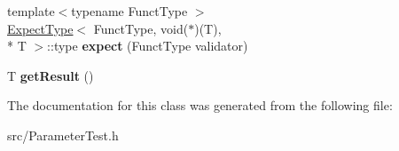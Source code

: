 \begin{DoxyCompactItemize}
\item 
\hypertarget{class_result_wrapper_a8a67c85158b1409e5d505f35e9b0288a}{{\footnotesize template$<$typename Funct\-Type $>$ }\\\hyperlink{struct_expect_type}{Expect\-Type}$<$ Funct\-Type, void($\ast$)(T), \\*
T $>$\-::type {\bfseries expect} (Funct\-Type validator)}\label{class_result_wrapper_a8a67c85158b1409e5d505f35e9b0288a}

\item 
\hypertarget{class_result_wrapper_a3325557a90094ce9fcffa2fb0712a0c5}{T {\bfseries get\-Result} ()}\label{class_result_wrapper_a3325557a90094ce9fcffa2fb0712a0c5}

\end{DoxyCompactItemize}


The documentation for this class was generated from the following file\-:\begin{DoxyCompactItemize}
\item 
src/Parameter\-Test.\-h\end{DoxyCompactItemize}
